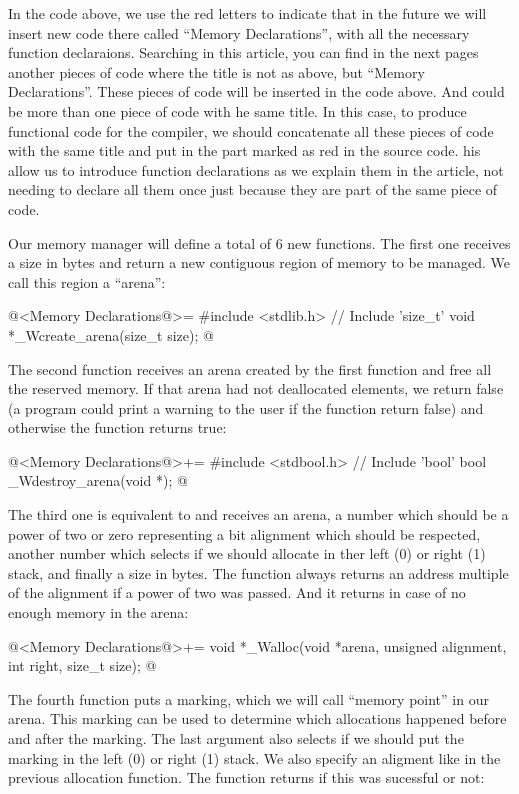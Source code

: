 In the code above, we use the red letters to indicate that in the
future we will insert new code there called ``Memory Declarations'',
with all the necessary function declaraions. Searching in this
article, you can find in the next pages another pieces of code where
the title is not  as above, but ``Memory
Declarations''. These pieces of code will be inserted in the code
above. And could be more than one piece of code with he same title. In
this case, to produce functional code for the compiler, we should
concatenate all these pieces of code with the same title and put in
the part marked as red in the source code. his allow us to introduce
function declarations as we explain them in the article, not needing
to declare all them once just because they are part of the same piece
of code.


Our memory manager will define a total of 6 new functions. The first
one receives a size in bytes and return a new contiguous region of
memory to be managed. We call this region a ``arena'':

\iniciocodigo
@<Memory Declarations@>=
#include <stdlib.h> // Include 'size_t'
void *_Wcreate_arena(size_t size);
@
\fimcodigo

The second function receives an arena created by the first function
and free all the reserved memory. If that arena had not deallocated
elements, we return false (a program could print a warning to the user
if the function return false) and otherwise the function returns true:

\iniciocodigo
@<Memory Declarations@>+=
#include <stdbool.h> // Include 'bool'
bool _Wdestroy_arena(void *);
@
\fimcodigo

The third one is equivalent to  and receives an
arena, a number which should be a power of two or zero representing a
bit alignment which should be respected, another number which selects
if we should allocate in ther left (0) or right (1) stack, and finally
a size in bytes. The function always returns an address multiple of
the alignment if a power of two was passed. And it
returns  in case of no enough memory in the arena:

\iniciocodigo
@<Memory Declarations@>+=
void *_Walloc(void *arena, unsigned alignment, int right, size_t size);
@
\fimcodigo

The fourth function puts a marking, which we will call ``memory
point'' in our arena. This marking can be used to determine which
allocations happened before and after the marking. The last argument
also selects if we should put the marking in the left (0) or right (1)
stack. We also specify an aligment like in the previous allocation
function. The function returns if this was sucessful or not:

